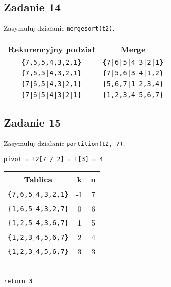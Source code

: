 \documentclass{article}
\begin{document}
\subsection*{Zadanie 14}
Zasymuluj działanie \verb+mergesort(t2)+.
\begin{center}
    \begin{tabular}{c c}
        \textbf{Rekurencyjny podział} & \textbf{Merge}         \\
        \hline
        \verb+{7,6,5,4,3,2,1}+        & \verb+{7|6|5|4|3|2|1}+ \\
        \verb+{7,6,5|4,3,2,1}+        & \verb+{7|5,6|3,4|1,2}+ \\
        \verb+{7|6,5|4,3|2,1}+        & \verb+{5,6,7|1,2,3,4}+ \\
        \verb+{7|6|5|4|3|2|1}+        & \verb+{1,2,3,4,5,6,7}+
    \end{tabular}
\end{center}

\subsection*{Zadanie 15}
Zasymuluj działanie \verb+partition(t2, 7)+.
\begin{center}
    \verb+pivot = t2[7 / 2] = t[3] = 4+ \\[1ex]
    \begin{tabular}{c c c}
        \textbf{Tablica}       & \textbf{k} & \textbf{n} \\
        \hline
        \verb+{7,6,5,4,3,2,1}+ & -1         & 7          \\
        \verb+{1,6,5,4,3,2,7}+ & 0          & 6          \\
        \verb+{1,2,5,4,3,6,7}+ & 1          & 5          \\
        \verb+{1,2,3,4,5,6,7}+ & 2          & 4          \\
        \verb+{1,2,3,4,5,6,7}+ & 3          & 3          \\
    \end{tabular} \\[1ex]
    \verb+return 3+
\end{center}
\end{document}
